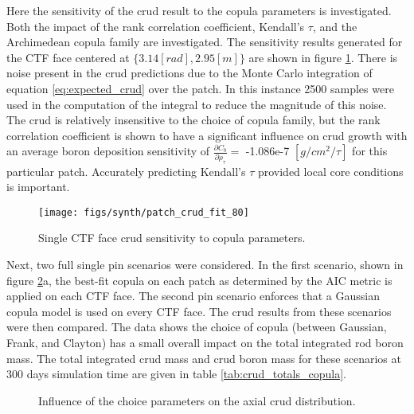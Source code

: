 Here the sensitivity of the crud result to the copula parameters is investigated.  Both the impact of the rank correlation coefficient, Kendall's $\tau$, and the Archimedean copula family are investigated.  The sensitivity results generated for the CTF face centered at $\{3.14[rad], 2.95[m]\}$ are shown in figure \ref{fig:patchcrudfit80}.  There is noise present in the crud predictions due to the Monte Carlo integration of equation \ref{eq:expected_crud} over the patch.  In this instance 2500 samples were used in the computation of the integral to reduce the magnitude of this noise.  The crud is relatively insensitive to the choice of copula family, but the rank correlation coefficient is shown to have a significant influence on crud growth with an average boron deposition sensitivity of $\frac{\partial C_b}{\partial \rho_\tau} =$ -1.086e-7 $[g/cm^2/\tau]$ for this particular patch.  Accurately predicting Kendall's $\tau$ provided local core conditions is important.

\begin{figure}[H]
    \centering
    \texttt{[image: figs/synth/patch\_crud\_fit\_80]}
    \caption{Single CTF face crud sensitivity to copula parameters.}
    \label{fig:patchcrudfit80}
\end{figure}

Next, two full single pin scenarios were considered. In the first scenario, shown in figure \ref{fig:crud_copula_fam_sensi}a, the best-fit copula on each patch as determined by the AIC metric is applied on each CTF face.  The second pin scenario enforces that a Gaussian copula model is used on every CTF face.  The crud results from these scenarios were then compared.  The data shows the choice of copula (between Gaussian, Frank, and Clayton) has a small overall impact on the total integrated rod boron mass.   The total integrated crud mass and crud boron mass for these scenarios at 300 days simulation time are given in table \ref{tab:crud_totals_copula}.

\begin{figure}[H]%
    \centering
    \qquad
    \caption[]{Influence of the choice parameters on the axial crud distribution.}%
    \label{fig:crud_copula_fam_sensi}%
\end{figure}


